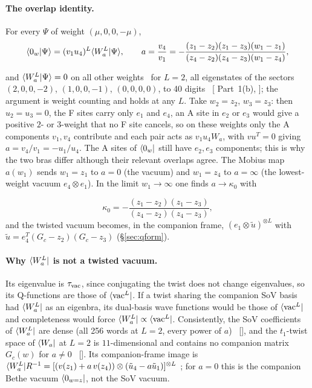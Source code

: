 \paragraph{The overlap identity.} For every $\Psi$ of weight $(\mu,0,0,-\mu)$,
\begin{equation}
 \langle0_w|\Psi\rangle=(v_1u_4)^L\langle W_a^L|\Psi\rangle,\qquad
 a=\frac{v_4}{v_1}=-\frac{(z_1-z_2)(z_1-z_3)(w_1-z_1)}{(z_4-z_2)(z_4-z_3)(w_1-z_4)},
\end{equation}
{\raggedright and $\langle W_a^L|\Psi\rangle=0$ on all other weights \ex\ for $L=2$, all eigenstates of the sectors $(2,0,0,-2)$,
$(1,0,0,-1)$, $(0,0,0,0)$, to 40 digits \hp\ [ Part~1(b), ]; the
argument is weight counting and holds at any $L$. Take $w_2=z_2$, $w_3=z_3$: then $u_2=u_3=0$, the F sites carry only $e_1$
and $e_4$, an A site in $e_2$ or $e_3$ would give a positive $2$- or $3$-weight that no F site cancels, so on these weights
only the A components $v_1,v_4$ contribute and each pair acts as $v_1u_4W_a$, with $vu^T=0$ giving $a=v_4/v_1=-u_1/u_4$. The
A sites of $\langle0_w|$ still have $e_2,e_3$ components; this is why the two bras differ although their relevant overlaps
agree. The Mobius map $a(w_1)$ sends $w_1=z_1$ to $a=0$ (the vacuum) and $w_1=z_4$ to $a=\infty$ (the lowest-weight vacuum
$e_4\otimes e_1$). In the limit $w_1\to\infty$ one finds $a\to\kappa_0$ with\par}
\begin{equation}
 \kappa_0=-\frac{(z_1-z_2)(z_1-z_3)}{(z_4-z_2)(z_4-z_3)},
\end{equation}
and the twisted vacuum becomes, in the companion frame, $(e_1\otimes\tilde u)^{\otimes L}$ with
$\tilde u=e_4^T(G_c-z_2)(G_c-z_3)$ (\S\ref{sec:qform}).

\paragraph{Why $\langle W_a^L|$ is not a twisted vacuum.} Its eigenvalue is $\tau_{\rm vac}$, since conjugating the twist does
not change eigenvalues, so its Q-functions are those of $\langle\mathrm{vac}^L|$. If a twist sharing the companion SoV basis had
$\langle W_a^L|$ as an eigenbra, its dual-basis wave functions would be those of $\langle\mathrm{vac}^L|$ and completeness would force
$\langle W_a^L|\propto\langle\mathrm{vac}^L|$. Consistently, the SoV coefficients of $\langle W_a^L|$ are dense (all 256 words at $L=2$,
every power of $a$) \ex\ [], and the $t_1$-twist space of $\langle W_a|$ at $L=2$ is $11$-dimensional
and contains no companion matrix $G_c(w)$ for $a\ne0$ \ex\ []. Its companion-frame image
is $\langle W_a^L|R^{-1}=[(v(z_1)+a\,v(z_4))\otimes(\tilde u_4-a\tilde u_1)]^{\otimes L}$ \ex; for $a=0$ this is the companion
Bethe vacuum $\langle0_{w=z}|$, not the SoV vacuum.

